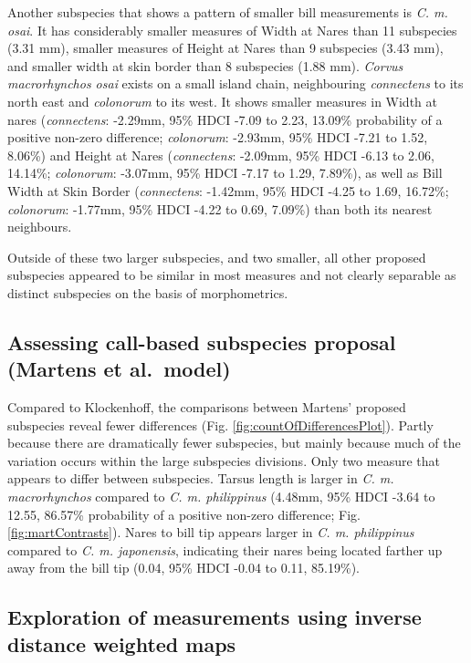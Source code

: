\documentclass[10pt,a4paper]{article}
\begin{document}
Another subspecies that shows a pattern of smaller bill measurements is \emph{C. m. osai}.
It has considerably smaller measures of Width at Nares than 11 subspecies (3.31 mm), smaller measures of Height at Nares than 9 subspecies (3.43 mm), and smaller width at skin border than 8 subspecies (1.88 mm).
\emph{Corvus macrorhynchos osai} exists on a small island chain, neighbouring \emph{connectens} to its north east and \emph{colonorum} to its west.
It shows smaller measures in Width at nares (\emph{connectens}: -2.29mm, 95\% HDCI -7.09 to 2.23, 13.09\% probability of a positive non-zero difference; \emph{colonorum}: -2.93mm, 95\% HDCI -7.21 to 1.52, 8.06\%) and Height at Nares (\emph{connectens}: -2.09mm, 95\% HDCI -6.13 to 2.06, 14.14\%; \emph{colonorum}: -3.07mm, 95\% HDCI -7.17 to 1.29, 7.89\%), as well as Bill Width at Skin Border (\emph{connectens}: -1.42mm, 95\% HDCI -4.25 to 1.69, 16.72\%; \emph{colonorum}: -1.77mm, 95\% HDCI -4.22 to 0.69, 7.09\%) than both its nearest neighbours.

Outside of these two larger subspecies, and two smaller, all other proposed subspecies appeared to be similar in most measures and not clearly separable as distinct subspecies on the basis of morphometrics.

\subsection{Assessing call-based subspecies proposal (Martens et al.~model)}\label{assessing-call-based-subspecies-proposal-martens-et-al.-model}

Compared to Klockenhoff, the comparisons between Martens' proposed subspecies reveal fewer differences (Fig. \ref{fig:countOfDifferencesPlot}).
Partly because there are dramatically fewer subspecies, but mainly because much of the variation occurs within the large subspecies divisions.
Only two measure that appears to differ between subspecies.
Tarsus length is larger in \emph{C. m. macrorhynchos} compared to \emph{C. m. philippinus} (4.48mm, 95\% HDCI -3.64 to 12.55, 86.57\% probability of a positive non-zero difference; Fig. \ref{fig:martContrasts}).
Nares to bill tip appears larger in \emph{C. m. philippinus} compared to \emph{C. m. japonensis}, indicating their nares being located farther up away from the bill tip (0.04, 95\% HDCI -0.04 to 0.11, 85.19\%).

\subsection{Exploration of measurements using inverse distance weighted maps}\label{exploration-of-measurements-using-inverse-distance-weighted-maps}
\end{document}
